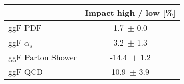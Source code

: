 \begin{tabular}{| l || c  | }
\hline
 & Impact high / low [\%] \tabularnewline
\hline
ggF PDF & 1.7\, $\pm$  0.0 \tabularnewline
ggF $\alpha_s$ & 3.2\, $\pm$  1.3 \tabularnewline
ggF Parton Shower & -14.4\, $\pm$  1.2 \tabularnewline
ggF QCD  & 10.9\, $\pm$  3.9 \tabularnewline
\hline
\end{tabular}